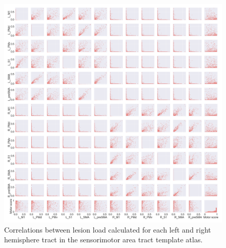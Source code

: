 \documentclass[10pt]{article}
\begin{document}
\begin{figure}[ht]
\centering
\includegraphics[width=1\linewidth]{figures/SMATT_bi_scatterplts.png}
\caption{Correlations between lesion load calculated for each left and right hemisphere tract in the sensorimotor area tract template atlas.}
\label{smatt_pairwise_correlations_bi}
\end{figure}
\end{document}
